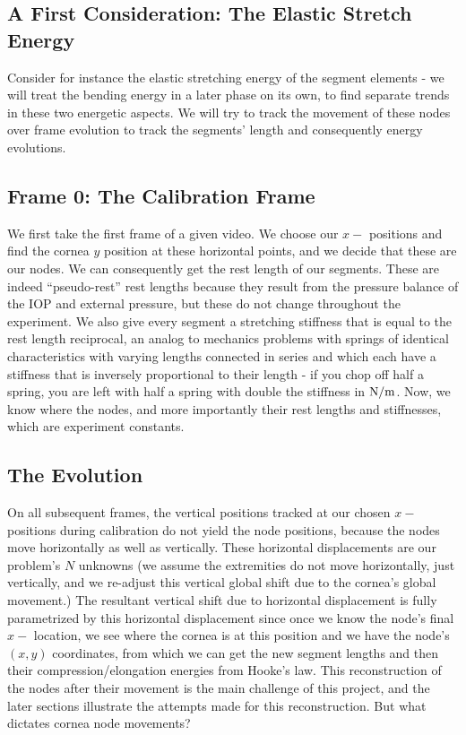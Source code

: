 \documentclass[epjST]{svjour}
\begin{document}
\subsection{A First Consideration: The Elastic Stretch Energy}
Consider for instance the elastic stretching energy of the segment elements - we will treat the bending energy in a later phase on its own, to find separate trends in these two energetic aspects. We will try to track the movement of these nodes over frame evolution to track the segments' length and consequently energy evolutions.
\subsection{Frame 0: The Calibration Frame}
We first take the first frame of a given video. We choose our $x-$ positions and find the cornea $y$ position at these horizontal points, and we decide that these are our nodes. We can consequently get the rest length of our segments. These are indeed ``pseudo-rest'' rest lengths because they result from the pressure balance of the IOP and external pressure, but these do not change throughout the experiment. We also give every segment a stretching stiffness that is equal to the rest length reciprocal, an analog to mechanics problems with springs of identical characteristics with varying lengths connected in series and which each have a stiffness that is inversely proportional to their length - if you chop off half a spring, you are left with half a spring with double the stiffness in $\rm N/m$. Now, we know where the nodes, and more importantly their rest lengths and stiffnesses, which are experiment constants.
\subsection{The Evolution}
On all subsequent frames, the vertical positions tracked at our chosen $x-$ positions during calibration do not yield the node positions, because the nodes move horizontally as well as vertically. These horizontal displacements are our problem's $N$ unknowns (we assume the extremities do not move horizontally, just vertically, and we re-adjust this vertical global shift due to the cornea's global movement.) The resultant vertical shift due to horizontal displacement is fully parametrized by this horizontal displacement since once we know the node's final $x-$ location, we see where the cornea is at this position and we have the node's $(x,y)$ coordinates, from which we can get the new segment lengths and then their compression/elongation energies from Hooke's law. This reconstruction of the nodes after their movement is the main challenge of this project, and the later sections illustrate the attempts made for this reconstruction. But what dictates cornea node movements?
\end{document}

